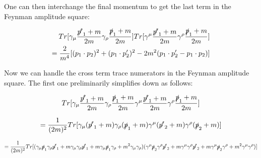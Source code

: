 \documentclass[a4]{article}
\begin{document}
    One can then interchange the final momentum to get the last term in the Feynman amplitude square:

    \begin{framed}
        \begin{equation}
            \begin{aligned}
                Tr [\gamma_\mu \frac{\slashed{p'}_1 + m}{2m} \gamma_\rho \frac{\slashed{p}_1 + m}{2 m}] Tr [\gamma^\mu \frac{\slashed{p'}_1 + m}{2m} \gamma^\rho \frac{\slashed{p}_1 + m}{2 m}] \\
                = \frac{2}{m^4} [(p_1 \cdot p_2)^2 + (p_1 \cdot p'_2)^2 - 2 m^2 (p_1 \cdot p'_2 - p_1 \cdot p_2)]
            \end{aligned}
        \end{equation}
    \end{framed}

    Now we can handle the cross term trace numerators in the Feynman amplitude square. The first one preliminarily simplifies down as follows:

    \begin{equation}
        Tr [\gamma_\mu \frac{\slashed{p'}_1 + m}{2m} \gamma_\rho \frac{\slashed{p}_1 + m}{2 m} \gamma^\mu \frac{\slashed{p'}_1 + m}{2m} \gamma^\rho \frac{\slashed{p}_1 + m}{2 m}]
    \end{equation}

    \begin{equation}
        = \frac{1}{(2 m)^2} Tr [\gamma_\mu (\slashed{p'}_1 + m) \gamma_\rho (\slashed{p}_1 + m) \gamma^\mu (\slashed{p'}_2 + m) \gamma^\rho (\slashed{p}_2 + m)]
    \end{equation}

    \begin{equation}
        = \frac{1}{(2 m)^2} Tr [(\gamma_\mu \slashed{p}_1 \gamma_\rho \slashed{p'}_1 + m \gamma_\mu \gamma_\rho \slashed{p'}_1 + m \gamma_\mu \slashed{p}_1 \gamma_\rho + m^2 \gamma_\mu \gamma_\rho) (\gamma^\mu \slashed{p}_2 \gamma^\rho \slashed{p'}_2 + m \gamma^\mu \gamma^\rho \slashed{p'}_2 + m \gamma^\mu \slashed{p}_2 \gamma^\rho + m^2 \gamma^\mu \gamma^\rho)]
    \end{equation}
\end{document}
